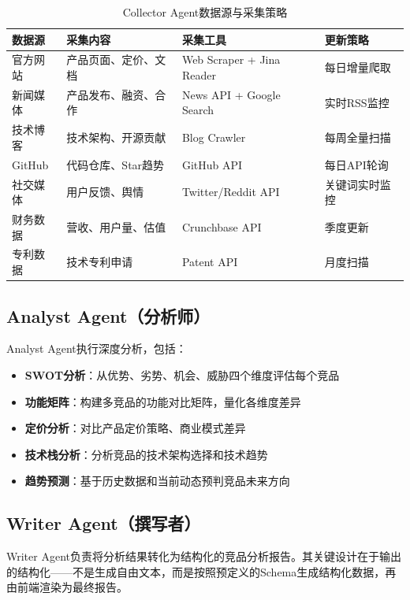 \documentclass[12pt,a4paper]{ctexrep}
\begin{document}
\begin{table}[H]
\centering
\caption{Collector Agent数据源与采集策略}
\label{tab:collector-sources}
{\small
\begin{tabular}{p{2.5cm} p{4cm} p{3cm} p{3.5cm}}
\toprule
\textbf{数据源} & \textbf{采集内容} & \textbf{采集工具} & \textbf{更新策略} \\
\midrule
官方网站 & 产品页面、定价、文档 & Web Scraper + Jina Reader & 每日增量爬取 \\
\addlinespace
新闻媒体 & 产品发布、融资、合作 & News API + Google Search & 实时RSS监控 \\
\addlinespace
技术博客 & 技术架构、开源贡献 & Blog Crawler & 每周全量扫描 \\
\addlinespace
GitHub & 代码仓库、Star趋势 & GitHub API & 每日API轮询 \\
\addlinespace
社交媒体 & 用户反馈、舆情 & Twitter/Reddit API & 关键词实时监控 \\
\addlinespace
财务数据 & 营收、用户量、估值 & Crunchbase API & 季度更新 \\
\addlinespace
专利数据 & 技术专利申请 & Patent API & 月度扫描 \\
\bottomrule
\end{tabular}
}
\end{table}

\subsection{Analyst Agent（分析师）}

Analyst Agent执行深度分析，包括：

\begin{itemize}[leftmargin=2em]
\item \textbf{SWOT分析}：从优势、劣势、机会、威胁四个维度评估每个竞品
\item \textbf{功能矩阵}：构建多竞品的功能对比矩阵，量化各维度差异
\item \textbf{定价分析}：对比产品定价策略、商业模式差异
\item \textbf{技术栈分析}：分析竞品的技术架构选择和技术趋势
\item \textbf{趋势预测}：基于历史数据和当前动态预判竞品未来方向
\end{itemize}

\subsection{Writer Agent（撰写者）}

Writer Agent负责将分析结果转化为结构化的竞品分析报告。其关键设计在于输出的结构化——不是生成自由文本，而是按照预定义的Schema生成结构化数据，再由前端渲染为最终报告。
\end{document}
